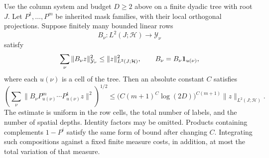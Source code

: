 \begin{lemma}[Compression]
\label{lem:compression}
Use the column system and budget $D\ge2$ above on a finite dyadic tree with
root $J$.  Let $P^1,\ldots,P^m$ be inherited mask families, with their local
orthogonal projections.  Suppose finitely many bounded linear rows
\[
 B_\nu:L^2(J;\mathcal H)\longrightarrow\mathcal Y_\nu
\]
satisfy
\[
 \sum_\nu\|B_\nu z\|_{\mathcal Y_\nu}^2\le\|z\|_{L^2(J;\mathcal H)}^2,
 \qquad B_\nu=B_\nu\mathbf 1_{u(\nu)},
\]
where each $u(\nu)$ is a cell of the tree.  Then an absolute constant $C$
satisfies
\[
 \left(\sum_\nu
    \|B_\nu P_{u(\nu)}^m\cdots P_{u(\nu)}^1z\|^2\right)^{1/2}
 \le \bigl(C(m+1)^C\log(2D)\bigr)^{C(m+1)}\|z\|_{L^2(J;\mathcal H)}.
\]
The estimate is uniform in the row cells, the total number of labels, and the
number of spatial depths.  Identity factors may be omitted.  Products
containing complements $1-P^i$ satisfy the same form of bound after changing
$C$.  Integrating such compositions against a fixed finite measure costs, in
addition, at most the total variation of that measure.
\end{lemma}

